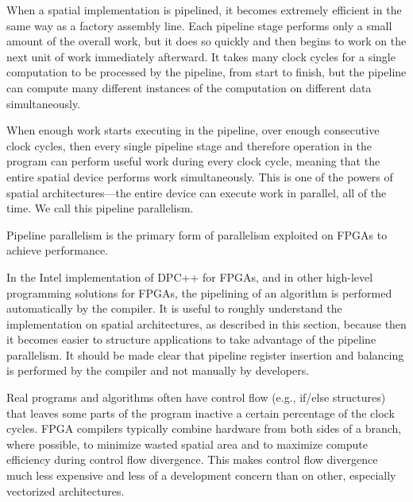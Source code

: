 When a spatial implementation is pipelined, it becomes extremely efficient in the same way as a factory assembly line. Each pipeline stage performs only a small amount of the overall work, but it does so quickly and then begins to work on the next unit of work immediately afterward. It takes many clock cycles for a single computation to be processed by the pipeline, from start to finish, but the pipeline can compute many different instances of the computation on different data simultaneously.\par

When enough work starts executing in the pipeline, over enough consecutive clock cycles, then every single pipeline stage and therefore operation in the program can perform useful work during every clock cycle, meaning that the entire spatial device performs work simultaneously. This is one of the powers of spatial architectures—the entire device can execute work in parallel, all of the time. We call this pipeline parallelism.\par

\begin{tcolorbox}[colback=red!5!white,colframe=red!75!black]
Pipeline parallelism is the primary form of parallelism exploited on FPGAs to achieve performance.
\end{tcolorbox}

\begin{tcolorbox}[colback=blue!5!white,colframe=blue!75!black, title=PIPELINING IS AUTOMATIC]
In the Intel implementation of DPC++ for FPGAs, and in other high-level programming solutions for FPGAs, the pipelining of an algorithm is performed automatically by the compiler. It is useful to roughly understand the implementation on spatial architectures, as described in this section, because then it becomes easier to structure applications to take advantage of the pipeline parallelism. It should be made clear that pipeline register insertion and balancing is performed by the compiler and not manually by developers.
\end{tcolorbox}

Real programs and algorithms often have control flow (e.g., if/else structures) that leaves some parts of the program inactive a certain percentage of the clock cycles. FPGA compilers typically combine hardware from both sides of a branch, where possible, to minimize wasted spatial area and to maximize compute efficiency during control flow divergence. This makes control flow divergence much less expensive and less of a development concern than on other, especially vectorized architectures.\par

